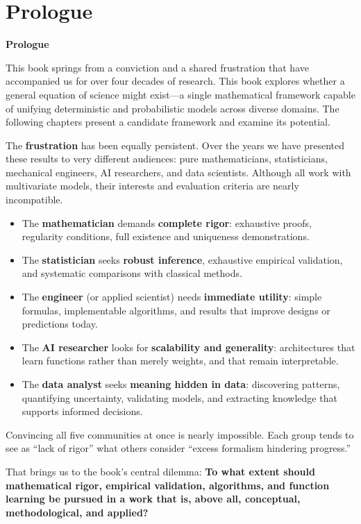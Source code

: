 \chapter*{Prologue}
\noindent \textbf{Prologue}

This book springs from a conviction and a shared frustration that have accompanied us for over four decades of research. This book explores whether a general equation of science might exist—a single mathematical framework capable of unifying deterministic and probabilistic models across diverse domains. The following chapters present a candidate framework and examine its potential.

The \textbf{frustration} has been equally persistent. Over the years we have presented these results to very different audiences: pure mathematicians, statisticians, mechanical engineers, AI researchers, and data scientists. Although all work with multivariate models, their interests and evaluation criteria are nearly incompatible.

\begin{itemize}
\item The \textbf{mathematician} demands \textbf{complete rigor}: exhaustive proofs, regularity conditions, full existence and uniqueness demonstrations.
\item The \textbf{statistician} seeks \textbf{robust inference}, exhaustive empirical validation, and systematic comparisons with classical methods.
\item The \textbf{engineer} (or applied scientist) needs \textbf{immediate utility}: simple formulas, implementable algorithms, and results that improve designs or predictions today.
\item The \textbf{AI researcher} looks for \textbf{scalability and generality}: architectures that learn functions rather than merely weights, and that remain interpretable.
\item The \textbf{data analyst} seeks \textbf{meaning hidden in data}: discovering patterns, quantifying uncertainty, validating models, and extracting knowledge that supports informed decisions.
\end{itemize}

Convincing all five communities at once is nearly impossible. Each group tends to see as ``lack of rigor'' what others consider ``excess formalism hindering progress.''

That brings us to the book's central dilemma: \textbf{To what extent should mathematical rigor, empirical validation, algorithms, and function learning be pursued in a work that is, above all, conceptual, methodological, and applied?}

